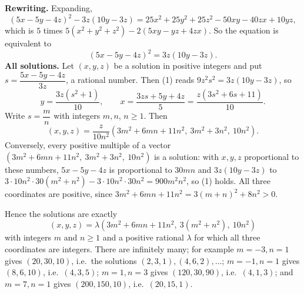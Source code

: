 \textbf{Rewriting.} Expanding,
\[
(5x-5y-4z)^2-3z(10y-3z)=25x^2+25y^2+25z^2-50xy-40zx+10yz,
\]
which is $5$ times $5(x^2+y^2+z^2)-2(5xy-yz+4zx)$. So the equation is equivalent to
\[
(5x-5y-4z)^2=3z(10y-3z). \tag{1}
\]
\textbf{All solutions.} Let $(x,y,z)$ be a solution in positive integers and put $s=\dfrac{5x-5y-4z}{3z}$, a rational number. Then (1) reads $9z^2s^2=3z(10y-3z)$, so
\[
y=\dfrac{3z\left(s^2+1\right)}{10},\qquad x=\dfrac{3zs+5y+4z}{5}=\dfrac{z\left(3s^2+6s+11\right)}{10}.
\]
Write $s=\dfrac {m}{n}$ with integers $m,n$, $n\ge1$. Then
\[
(x,y,z)=\dfrac{z}{10n^2}\left(3m^2+6mn+11n^2,\ 3m^2+3n^2,\ 10n^2\right). \tag{2}
\]
Conversely, every positive multiple of a vector $\left(3m^2+6mn+11n^2,\ 3m^2+3n^2,\ 10n^2\right)$ is a solution: with $x,y,z$ proportional to these numbers, $5x-5y-4z$ is proportional to $30mn$ and $3z(10y-3z)$ to $3\cdot10n^2\cdot30\left(m^2+n^2\right)-3\cdot10n^2\cdot30n^2=900m^2n^2$, so (1) holds. All three coordinates are positive, since $3m^2+6mn+11n^2=3(m+n)^2+8n^2>0$.

Hence the solutions are exactly
\[
\boxed{(x,y,z)=\lambda\left(3m^2+6mn+11n^2,\ 3\left(m^2+n^2\right),\ 10n^2\right)}
\]
with integers $m$ and $n\ge1$ and a positive rational $\lambda$ for which all three coordinates are integers. There are infinitely many; for example $m=-3,n=1$ gives $(20,30,10)$, i.e.\ the solutions $(2,3,1),(4,6,2),\dots$; $m=-1,n=1$ gives $(8,6,10)$, i.e.\ $(4,3,5)$; $m=1,n=3$ gives $(120,30,90)$, i.e.\ $(4,1,3)$; and $m=7,n=1$ gives $(200,150,10)$, i.e.\ $(20,15,1)$.
